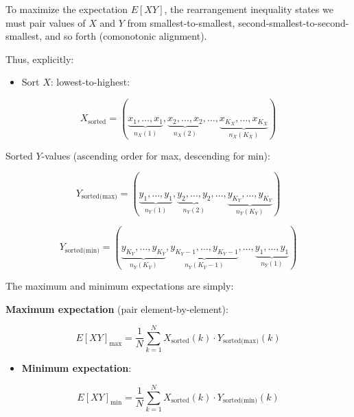 \documentclass[
  12pt,
]{article}
\providecommand{\tightlist}{%
  \setlength{\itemsep}{0pt}\setlength{\parskip}{0pt}}
\theoremstyle{plain}
\theoremstyle{definition}
\theoremstyle{remark}
\begin{document}
To maximize the expectation \(E[XY]\), the rearrangement inequality
states we must pair values of \(X\) and \(Y\) from smallest-to-smallest,
second-smallest-to-second-smallest, and so forth (comonotonic
alignment).

Thus, explicitly:

\begin{itemize}
\tightlist
\item
  Sort \(X\): lowest-to-highest:
\end{itemize}

\[X_{\text{sorted}} = (\underbrace{x_1,\dots,x_1}_{n_X(1)}, \underbrace{x_2,\dots,x_2}_{n_X(2)}, \dots,\underbrace{x_{K_X},\dots,x_{K_X}}_{n_X(K_X)})\]

Sorted \(Y\)-values (ascending order for max, descending for min):

\[Y_{\text{sorted(max)}} = (\underbrace{y_1,\dots,y_1}_{n_Y(1)}, \underbrace{y_2,\dots,y_2}_{n_Y(2)}, \dots,\underbrace{y_{K_Y},\dots,y_{K_Y}}_{n_Y(K_Y)})\]

\[Y_{\text{sorted(min)}} = (\underbrace{y_{K_Y},\dots,y_{K_Y}}_{n_Y(K_Y)}, \underbrace{y_{K_Y-1},\dots,y_{K_Y-1}}_{n_Y(K_Y-1)}, \dots,\underbrace{y_1,\dots,y_1}_{n_Y(1)})\]

The maximum and minimum expectations are simply:

\textbf{Maximum expectation} (pair element-by-element):

\[E[XY]_{\text{max}} = \frac{1}{N}\sum_{k=1}^{N} X_{\text{sorted}}(k)\cdot Y_{\text{sorted(max)}}(k)\]

\begin{itemize}
\tightlist
\item
  \textbf{Minimum expectation}:
\end{itemize}

\[E[XY]_{\text{min}} = \frac{1}{N}\sum_{k=1}^{N} X_{\text{sorted}}(k)\cdot Y_{\text{sorted(min)}}(k)\]
\end{document}
